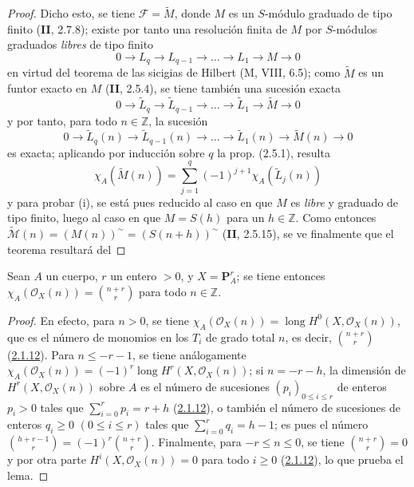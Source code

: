 \begin{proof}
Dicho esto, se tiene $\mathcal F=\widetilde M$, donde $M$ es un $S$-módulo
graduado de tipo finito (\textbf{II}, 2.7.8); existe por tanto una resolución finita
de $M$ por $S$-módulos graduados \emph{libres} de tipo finito
\[
0\to L_q\to L_{q-1}\to\ldots\to L_1\to M\to0
\]
en virtud del teorema de las sicigias de Hilbert (M, VIII, 6.5); como
$\widetilde M$ es un funtor exacto en $M$ (\textbf{II}, 2.5.4), se tiene
también una sucesión exacta
\[
0\to\widetilde L_q\to\widetilde L_{q-1}\to\ldots
\to\widetilde L_1\to\widetilde M\to0
\]
y por tanto, para todo $n\in\mathbb Z$, la sucesión
\[
0\to\widetilde L_q(n)\to\widetilde L_{q-1}(n)\to\ldots
\to\widetilde L_1(n)\to\widetilde M(n)\to0
\]
es exacta; aplicando por inducción sobre $q$ la prop. (2.5.1), resulta
\[
\chi_A(\widetilde M(n))=\sum_{j=1}^{q}(-1)^{j+1}
\chi_A(\widetilde L_j(n))
\]
y para probar (i), se está pues reducido al caso en que $M$ es \emph{libre} y graduado
de tipo finito, luego al caso en que $M=S(h)$ para un $h\in\mathbb Z$. Como
entonces $\widetilde{\mathcal M}(n)=(M(n))^\sim=(S(n+h))^\sim$ (\textbf{II}, 2.5.15), se ve
finalmente que el teorema resultará del
\end{proof}

\begin{lemma}[2.5.3.1]
\label{III.2.5.3.1-fr}
Sean $A$ un cuerpo, $r$ un entero $>0$, y $X=\mathbf P_A^r$; se tiene
entonces
$\chi_A(\mathcal O_X(n))=\binom{n+r}{r}$
para todo $n\in\mathbb Z$.
\end{lemma}

\begin{proof}
En efecto, para $n>0$, se tiene
$\chi_A(\mathcal O_X(n))=\operatorname{long}H^0(X,\mathcal O_X(n))$, que
es el número de monomios en los $T_i$ de grado total $n$, es decir,
$\binom{n+r}{r}$ (\hyperref[III.2.1.12-fr]{2.1.12}). Para
$n\leq-r-1$, se tiene análogamente
$\chi_A(\mathcal O_X(n))=(-1)^r
\operatorname{long}H^r(X,\mathcal O_X(n))$;
si $n=-r-h$, la dimensión de $H^r(X,\mathcal O_X(n))$ sobre $A$ es el
número de sucesiones $(p_i)_{0\leq i\leq r}$ de enteros $p_i>0$ tales que
$\sum_{i=0}^{r}p_i=r+h$ (\hyperref[III.2.1.12-fr]{2.1.12}), o también el
número de sucesiones de enteros $q_i\geq0$ $(0\leq i\leq r)$ tales que
$\sum_{i=0}^{r}q_i=h-1$; es pues el número
$\binom{h+r-1}{r}=(-1)^r\binom{n+r}{r}$.
Finalmente, para $-r\leq n\leq0$, se tiene $\binom{n+r}{r}=0$ y por otra parte
$H^i(X,\mathcal O_X(n))=0$ para todo $i\geq0$
(\hyperref[III.2.1.12-fr]{2.1.12}), lo que prueba el lema.
\end{proof}

